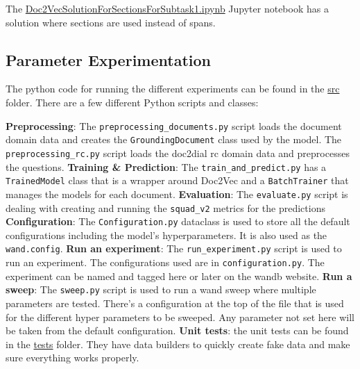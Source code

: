 \documentclass[11pt]{article}
\begin{document}
    The \href{https://github.com/isabelladegen/nlp-2021/blob/main/notebooks/Doc2VecSolutionForSectionsForSubtask1.ipynb}{Doc2VecSolutionForSectionsForSubtask1.ipynb}
    Jupyter notebook has a solution where sections are used instead of spans.

    \subsection{Parameter Experimentation}\label{subsec:experimentation-experiment}
    The python code for running the different experiments can be found in the \href{https://github.com/isabelladegen/nlp-2021/tree/main/src}{src}
    folder. There are a few different Python scripts and classes:
    \begin{outline}
        \1 \textbf{Preprocessing}: The \texttt{preprocessing\_documents.py} script loads the document domain data and creates the
        \texttt{GroundingDocument} class used by the model. The \texttt{preprocessing\_rc.py} script loads the doc2dial rc
        domain data and preprocesses the questions.
        \1 \textbf{Training \& Prediction}: The \texttt{train\_and\_predict.py} has a \texttt{TrainedModel} class that is a wrapper around
        Doc2Vec and a \texttt{BatchTrainer} that manages the models for each document.
        \1 \textbf{Evaluation}: The \texttt{evaluate.py} script is dealing with creating and running the \texttt{squad\_v2} metrics for the predictions
        \1 \textbf{Configuration}: The \texttt{Configuration.py} dataclass is used to store all the default configurations including
        the model's hyperparameters. It is also used as the \texttt{wand.config}.
        \1 \textbf{Run an experiment}: The \texttt{run\_experiment.py} script is used to run an experiment.
        The configurations used are in \texttt{configuration.py}.
        The experiment can be named and tagged here or later on the wandb website.
        \1 \textbf{Run a sweep}: The \texttt{sweep.py} script is used to run a wand sweep where multiple parameters are tested.
        There's a configuration at the top of the file that is used for the different hyper parameters to be sweeped.
        Any parameter not set here will be taken from the default configuration.
        \1 \textbf{Unit tests}: the unit tests can be found in the \href{https://github.com/isabelladegen/nlp-2021/tree/main/tests}{tests}
        folder. They have data builders to quickly create fake data and make sure everything works properly.
    \end{outline}
\end{document}
